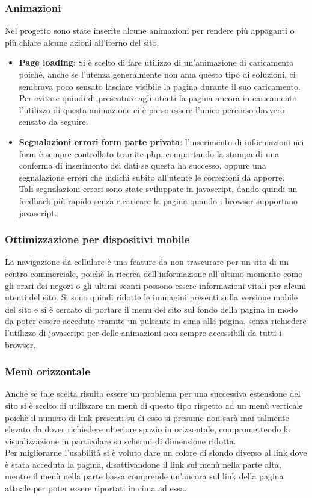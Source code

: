 \documentclass[a4paper,12pt]{article}
\begin{document}
\subsubsection{Animazioni}
Nel progetto sono state inserite alcune animazioni per rendere più appaganti o più chiare alcune azioni all'iterno del sito.
\begin{itemize}
	\item \textbf{Page loading}: Si è scelto di fare utilizzo di un'animazione di caricamento poichè, anche se l'utenza generalmente non ama questo tipo di soluzioni, ci sembrava poco sensato lasciare visibile la pagina durante il suo caricamento. Per evitare quindi di presentare agli utenti la pagina ancora in caricamento l'utilizzo di questa animazione ci è parso essere l'unico percorso davvero sensato da seguire.
	
	\item \textbf{Segnalazioni errori form parte privata}: l'inserimento di informazioni nei form è sempre controllato tramite php, comportando la stampa di una conferma di inserimento dei dati se questa ha successo, oppure una segnalazione errori che indichi subito all'utente le correzioni da apporre.\\
	Tali segnalazioni errori sono state sviluppate in javascript, dando quindi un feedback più rapido senza ricaricare la pagina quando i browser supportano javascript.
\end{itemize}
\subsubsection{Ottimizzazione per dispositivi mobile}
La navigazione da cellulare è una feature da non trascurare per un sito di un centro commerciale, poichè la ricerca dell'informazione all'ultimo momento come gli orari dei negozi o gli ultimi sconti possono essere informazioni vitali per alcuni utenti del sito. Si sono quindi ridotte le immagini presenti sulla versione mobile del sito e si è cercato di portare il menu del sito sul fondo della pagina in modo da poter essere acceduto tramite un pulsante in cima alla pagina, senza richiedere l'utilizzo di javascript per delle animazioni non sempre accessibili da tutti i browser.
\subsubsection{Menù orizzontale}
Anche se tale scelta risulta essere un problema per una successiva estensione del sito si è scelto di utilizzare un menù di questo tipo rispetto ad un menù verticale poichè il numero di link presenti su di esso si presume non sarà mai talmente elevato da dover richiedere ulteriore spazio in orizzontale, compromettendo la visualizzazione in particolare su schermi di dimensione ridotta.\\
Per migliorarne l'usabilità si è voluto dare un colore di sfondo diverso al link dove è stata acceduta la pagina, disattivandone il link sul menù nella parte alta, mentre il menù nella parte bassa comprende un'ancora sul link della pagina attuale per poter essere riportati in cima ad essa.
\end{document}
